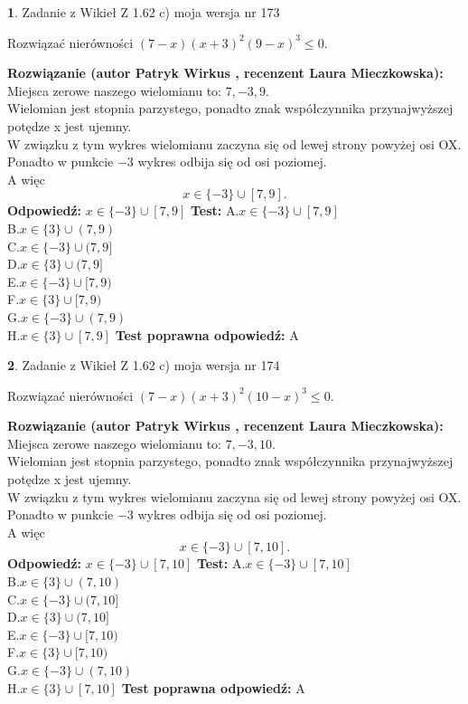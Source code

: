 \documentclass[12pt, a4paper]{article}
\theoremstyle{definition} %
\newtheorem{zad}{}
\newcommand{\zadStart}[1]{\begin{zad}#1\newline}
\newcommand{\zadStop}{\end{zad}}
\newcommand{\rozwStart}[2]{\noindent \textbf{Rozwiązanie (autor #1 , recenzent #2): }\newline}
\newcommand{\rozwStop}{\newline}
\newcommand{\odpStart}{\noindent \textbf{Odpowiedź:}\newline}
\newcommand{\odpStop}{\newline}
\newcommand{\testStart}{\noindent \textbf{Test:}\newline}
\newcommand{\testStop}{\newline}
\newcommand{\kluczStart}{\noindent \textbf{Test poprawna odpowiedź:}\newline}
\newcommand{\kluczStop}{\newline}
\begin{document}
\zadStart{Zadanie z Wikieł Z 1.62 c) moja wersja nr 173}

Rozwiązać nierówności $(7-x)(x+3)^{2}(9-x)^{3}\le0$.
\zadStop
\rozwStart{Patryk Wirkus}{Laura Mieczkowska}
Miejsca zerowe naszego wielomianu to: $7, -3, 9$.\\
Wielomian jest stopnia parzystego, ponadto znak współczynnika przy\linebreak najwyższej potędze x jest ujemny.\\ W związku z tym wykres wielomianu zaczyna się od lewej strony powyżej osi OX.\\
Ponadto w punkcie $-3$ wykres odbija się od osi poziomej.\\
A więc $$x \in \{-3\} \cup [7,9].$$
\rozwStop
\odpStart
$x \in \{-3\} \cup [7,9]$
\odpStop
\testStart
A.$x \in \{-3\} \cup [7,9]$\\
B.$x \in \{3\} \cup (7,9)$\\
C.$x \in \{-3\} \cup (7,9]$\\
D.$x \in \{3\} \cup (7,9]$\\
E.$x \in \{-3\} \cup [7,9)$\\
F.$x \in \{3\} \cup [7,9)$\\
G.$x \in \{-3\} \cup (7,9)$\\
H.$x \in \{3\} \cup [7,9]$
\testStop
\kluczStart
A
\kluczStop



\zadStart{Zadanie z Wikieł Z 1.62 c) moja wersja nr 174}

Rozwiązać nierówności $(7-x)(x+3)^{2}(10-x)^{3}\le0$.
\zadStop
\rozwStart{Patryk Wirkus}{Laura Mieczkowska}
Miejsca zerowe naszego wielomianu to: $7, -3, 10$.\\
Wielomian jest stopnia parzystego, ponadto znak współczynnika przy\linebreak najwyższej potędze x jest ujemny.\\ W związku z tym wykres wielomianu zaczyna się od lewej strony powyżej osi OX.\\
Ponadto w punkcie $-3$ wykres odbija się od osi poziomej.\\
A więc $$x \in \{-3\} \cup [7,10].$$
\rozwStop
\odpStart
$x \in \{-3\} \cup [7,10]$
\odpStop
\testStart
A.$x \in \{-3\} \cup [7,10]$\\
B.$x \in \{3\} \cup (7,10)$\\
C.$x \in \{-3\} \cup (7,10]$\\
D.$x \in \{3\} \cup (7,10]$\\
E.$x \in \{-3\} \cup [7,10)$\\
F.$x \in \{3\} \cup [7,10)$\\
G.$x \in \{-3\} \cup (7,10)$\\
H.$x \in \{3\} \cup [7,10]$
\testStop
\kluczStart
A
\kluczStop
\end{document}
